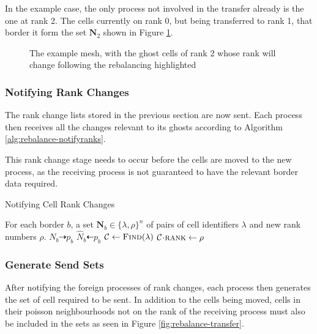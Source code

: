 \documentclass{IIBproject}
\newcommand{\vect}[1]{\bm{#1}}
\newcommand{\dra}{\dashrightarrow}
\newcommand{\dla}{\dashleftarrow}
\newcommand{\acc}{{\mkern 0.5mu\cdot\mkern 0.5mu}}
\begin{document}
In the example case, the only process not involved in the transfer already is the one at rank 2. The cells currently on rank 0, but being transferred to rank 1, that border it form the set $\vect{N}_2$ shown in Figure \ref{fig:rebalance-notify}.

\begin{figure}[H]
	\caption{The example mesh, with the ghost cells of rank 2 whose rank will change following the rebalancing highlighted}
	\label{fig:rebalance-notify}
	
\end{figure}


\subsubsection{Notifying Rank Changes}
\label{sec:rebalancing-notifyrank}

The rank change lists stored in the previous section are now sent. Each process then receives all the changes relevant to its ghosts according to Algorithm \ref{alg:rebalance-notifyranks}. 

This rank change stage needs to occur before the cells are moved to the new process, as the receiving process is not guaranteed to have the relevant border data required. 

\begin{algorithm}[H]
\caption{Notifying Cell Rank Changes}
\label{alg:rebalance-notifyranks}

\begin{algorithmic}
\Require For each border $b$, a set $\vect{N}_b \in \{\lambda,\rho\}^n$ of pairs of cell identifiers $\lambda$ and new rank numbers $\rho$.
\Statex
{}
	\Send $N_b \dra p_b$
\EndFor
\Statex
{}
	\Recv $\hat N_b \dla p_b$
		\State $\mathcal{C}\gets\textproc{Find}(\lambda)$
		\State $\mathcal{C}\acc\textproc{rank} \gets \rho$
	\EndFor
\EndFor
\end{algorithmic}
\end{algorithm}


\subsubsection{Generate Send Sets}
\label{sec:rebalancing-gensendset}

After notifying the foreign processes of rank changes, each process then generates the set of cell required to be sent. In addition to the cells being moved, cells in their poisson neighbourhoods not on the rank of the receiving process must also be included in the sets as seen in Figure \ref{fig:rebalance-transfer}.
\end{document}
